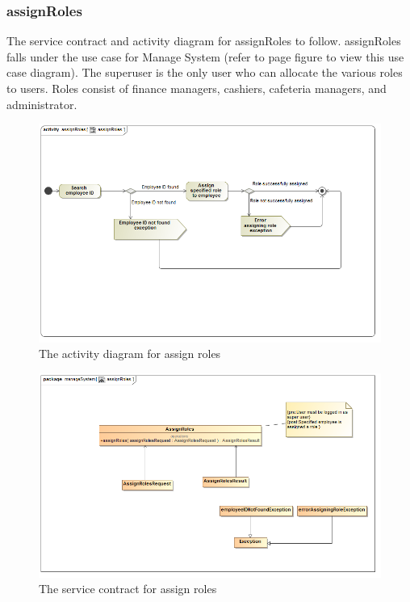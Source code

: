 \documentclass[a4paper,12pt]{report}
\begin{document}
\subsubsection{assignRoles}
The service contract and activity diagram for assignRoles to follow. assignRoles falls under the use case for Manage System (refer to page   figure   to view this use case diagram). The superuser is the only user who can allocate the various roles to users. Roles consist of finance managers, cashiers, cafeteria managers, and administrator. 
\begin{figure}[H]
  \centering
    \includegraphics[width=1.0\textwidth]{../images/assignRolesActivityDiagram.png}
    \caption{The activity diagram for assign roles} 
\end{figure}

\begin{figure}[H]
	\centering
	\includegraphics[width=1.0\textwidth]{../images/assignRolesServiceContract.png}
	\caption{The service contract for assign roles}
\end{figure}
\end{document}
